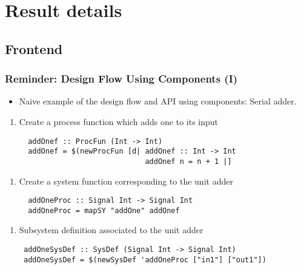 \documentclass{beamer}
\begin{document}
\section{Result details}

\beamerdefaultoverlayspecification{<+->}



\subsection{Frontend}

\begin{frame}[fragile]
  \frametitle{Reminder: Design Flow Using Components (I)}
  \begin{itemize}
  \item
  Naive example of the design flow and API using components: Serial adder.
  \end{itemize}
  
  
  \vspace{-0.7cm}
  \begin{overprint}
   \begin{enumerate}[1)]
   \item Create a process function which adds one to its input 
    \begin{lstlisting}
  addOnef :: ProcFun (Int -> Int)
  addOnef = $(newProcFun [d| addOnef :: Int -> Int 
                             addOnef n = n + 1 |]
    \end{lstlisting}
    \end{enumerate}
   
   \begin{enumerate}[2)]
   \item Create a system function corresponding to the unit adder
   \begin{lstlisting}
  addOneProc :: Signal Int -> Signal Int
  addOneProc = mapSY "addOne" addOnef
   \end{lstlisting}
   \end{enumerate}
   
   \begin{enumerate}[3)]
   \item Subsystem definition associated to the unit adder
   \begin{lstlisting}
 addOneSysDef :: SysDef (Signal Int -> Signal Int)
 addOneSysDef = $(newSysDef 'addOneProc ["in1"] ["out1"])
   \end{lstlisting}
   \end{enumerate}



\end{overprint}
\end{frame}
\end{document}
